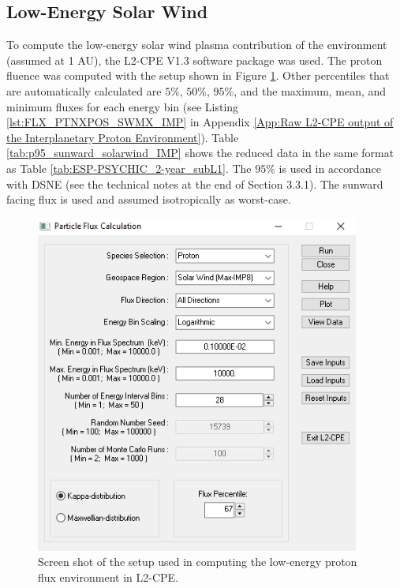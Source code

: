 \documentclass{hitec}
\begin{document}
\subsection{Low-Energy Solar Wind}
\label{ssec:natenv-Low-Energy Solar Wind}

To compute the low-energy solar wind plasma contribution of the environment (assumed at 1 AU), the L2-CPE V1.3 software package was used. The proton fluence was computed with the setup shown in Figure \ref{fig:L2-CPE-Setup}. Other percentiles that are automatically calculated are $5\%$, $50\%$, $95\%$, and the maximum, mean, and minimum fluxes for each energy bin (see Listing \ref{lst:FLX_PTNXPOS_SWMX_IMP} in Appendix \ref{App:Raw L2-CPE output of the Interplanetary Proton Environment}). Table \ref{tab:p95_sunward_solarwind_IMP} shows the reduced data in the same format as Table \ref{tab:ESP-PSYCHIC_2-year_subL1}. The $95\%$ is used in accordance with DSNE (see the technical notes at the end of Section 3.3.1). The sunward facing flux is used and assumed isotropically as worst-case. 

\begin{figure}[htbp!]
	\centering
	\includegraphics[width=0.95\textwidth]{../L2CPE/L2-CPE-Setup.PNG}
	\caption{Screen shot of the setup used in computing the low-energy proton flux environment in L2-CPE.}\label{fig:L2-CPE-Setup}
\end{figure}
\end{document}
